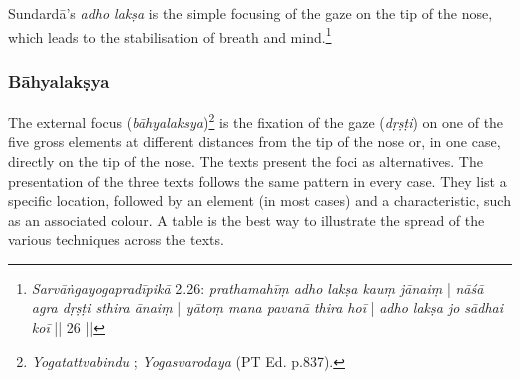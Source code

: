Sundardā's \textit{adho lakṣa} is the simple focusing of the gaze on the tip of the nose, which leads to the stabilisation of breath and mind.\footnote{\textit{Sarvāṅgayogapradīpikā} 2.26: \textit{prathamahīṃ adho lakṣa kauṃ jānaiṃ} | \textit{nāśā agra dṛṣṭi sthira ānaiṃ} | \textit{yātoṃ mana pavanā thira hoī} | \textit{adho lakṣa jo sādhai koī} || 26 ||}\\

\subsubsection{Bāhyalakṣya}
The external focus (\textit{bāhyalaksya})\footnote{\textit{Yogatattvabindu} ; \textit{Yogasvarodaya} (PT Ed. p.837).} is the fixation of the gaze (\textit{dṛṣṭi}) on one of the five gross elements at different distances from the tip of the nose or, in one case, directly on the tip of the nose. The texts present the foci as alternatives. The presentation of the three texts follows the same pattern in every case. They list a specific location, followed by an element (in most cases) and a characteristic, such as an associated colour. A table is the best way to illustrate the spread of the various techniques across the texts.
\newpage 
